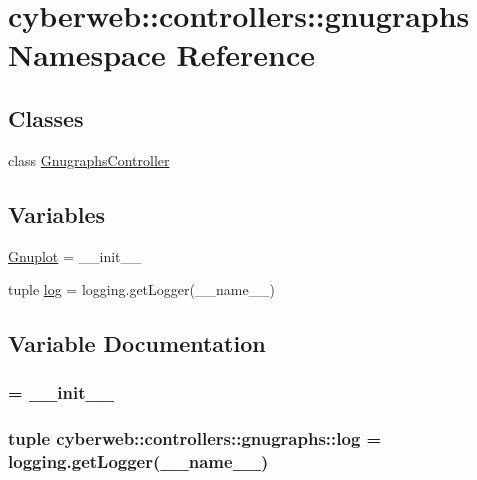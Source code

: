 \hypertarget{namespacecyberweb_1_1controllers_1_1gnugraphs}{\section{cyberweb\-:\-:controllers\-:\-:gnugraphs \-Namespace \-Reference}
\label{namespacecyberweb_1_1controllers_1_1gnugraphs}
}
\subsection*{\-Classes}
\begin{DoxyCompactItemize}
\item 
class \hyperlink{classcyberweb_1_1controllers_1_1gnugraphs_1_1_gnugraphs_controller}{\-Gnugraphs\-Controller}
\end{DoxyCompactItemize}
\subsection*{\-Variables}
\begin{DoxyCompactItemize}
\item 
\hyperlink{namespacecyberweb_1_1controllers_1_1gnugraphs_abef06e42a2f245f065bcfc5d08824028}{\-Gnuplot} = \-\_\-\-\_\-init\-\_\-\-\_\-
\item 
tuple \hyperlink{namespacecyberweb_1_1controllers_1_1gnugraphs_a55b7d486c643d7d9b44999496aafb10a}{log} = logging.\-get\-Logger(\-\_\-\-\_\-name\-\_\-\-\_\-)
\end{DoxyCompactItemize}


\subsection{\-Variable \-Documentation}
\hypertarget{namespacecyberweb_1_1controllers_1_1gnugraphs_abef06e42a2f245f065bcfc5d08824028}{
\subsubsection[{\-Gnuplot}]{ = \-\_\-\-\_\-init\-\_\-\-\_\-}}\label{namespacecyberweb_1_1controllers_1_1gnugraphs_abef06e42a2f245f065bcfc5d08824028}
\hypertarget{namespacecyberweb_1_1controllers_1_1gnugraphs_a55b7d486c643d7d9b44999496aafb10a}{
\subsubsection[{log}]{\setlength{\rightskip}{0pt plus 5cm}tuple {\bf cyberweb\-::controllers\-::gnugraphs\-::log} = logging.\-get\-Logger(\-\_\-\-\_\-name\-\_\-\-\_\-)}}\label{namespacecyberweb_1_1controllers_1_1gnugraphs_a55b7d486c643d7d9b44999496aafb10a}
